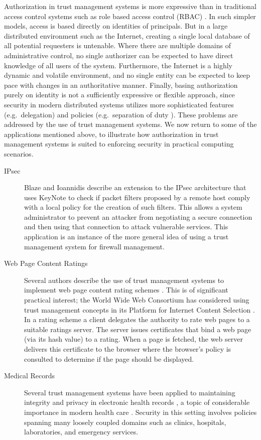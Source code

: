 Authorization in trust management systems is more expressive than in
traditional access control systems such as role based access control
(RBAC) \cite{Sandhu:RBACM}.  In such simpler models, access is based
directly on identities of principals.  But in a large distributed
environment such as the Internet, creating a single local database of
all potential requesters is untenable.  Where there are multiple
domains of administrative control, no single authorizer can be
expected to have direct knowledge of all users of the system.
Furthermore, the Internet is a highly dynamic and volatile
environment, and no single entity can be expected to keep pace with
changes in an authoritative manner.  Finally, basing authorization
purely on identity is not a sufficiently expressive or flexible
approach, since security in modern distributed systems utilizes more
sophisticated features (e.g.~delegation) and policies (e.g.~separation
of duty \cite{Simon:SODRBE}).  These problems are addressed by the use of trust
management systems.  We now return to some of the applications
mentioned above, to illustrate how authorization in trust management
systems is suited to enforcing security in practical computing
scenarios.
\begin{description}
\item[IPsec] Blaze and Ioannidis \cite{Blaze:TMIPS} describe an extension
  to the IPsec architecture that uses KeyNote to check if packet filters
  proposed by a remote host comply with a local policy for the creation of
  such filters. This allows a system administrator to prevent an attacker
  from negotiating a secure connection and then using that connection to
  attack vulnerable services. This application is an instance of the more
  general idea of using a trust management system for firewall management.
\item[Web Page Content Ratings] Several authors describe the use of trust
  management systems to implement web page content rating schemes
  \cite{Gunter:ADDUQCM,Chu:RTMWA}. This is of significant practical
  interest; the World Wide Web Consortium has considered using trust
  management concepts in its Platform for Internet Content Selection
  \cite{Resnick:PIACWC}. In a rating scheme a client delegates the
  authority to rate web pages to a suitable ratings server. The server
  issues certificates that bind a web page (via its hash value) to a
  rating. When a page is fetched, the web server delivers this certificate
  to the browser where the browser's policy is consulted to determine if
  the page should be displayed.
\item[Medical Records] Several trust management systems have been
  applied to maintaining integrity and privacy in electronic health
  records \cite{Bacon:MORBACSAS,Becker:CFTMAEHR}, a topic of
  considerable importance in modern health care \cite{Ota:PPCMI}.
  Security in this setting involves policies spanning many loosely
  coupled domains such as clinics, hospitals, laboratories, and
  emergency services.  
\end{description}

